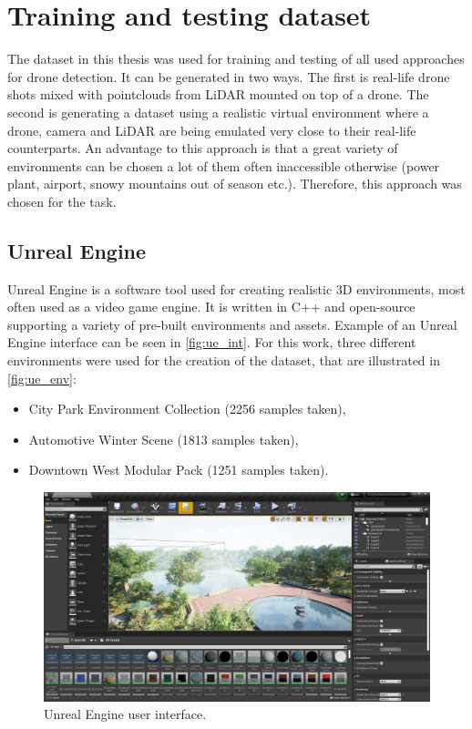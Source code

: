 \documentclass[twoside]{ctuthesis}
\theoremstyle{plain}
\theoremstyle{definition}
\theoremstyle{note}
\begin{document}
\section{Training and testing dataset} \label{s:2.6}
The dataset in this thesis was used for training and testing of all used approaches for drone detection. It can be generated in two ways. The first is real-life drone shots mixed with pointclouds from LiDAR mounted on top of a drone. The second is generating a dataset using a realistic virtual environment where a drone, camera and LiDAR are being emulated very close to their real-life counterparts. An advantage to this approach is that a great variety of environments can be chosen a lot of them often inaccessible otherwise (power plant, airport, snowy mountains out of season etc.). Therefore, this approach was chosen for the task.
\subsection{Unreal Engine}
Unreal Engine is a software tool used for creating realistic 3D environments, most often used as a video game engine. It is written in C++ and open-source supporting a variety of pre-built environments and assets. Example of an Unreal Engine interface can be seen in \autoref{fig:ue_int}. For this work, three different environments were used for the creation of the dataset, that are illustrated in \autoref{fig:ue_env}:
\begin{itemize}
	\item City Park Environment Collection (2256 samples taken),
	\item Automotive Winter Scene (1813 samples taken),
	\item Downtown West Modular Pack (1251 samples taken).
\end{itemize}
\begin{figure}
	\centering
	\includegraphics[width=\textwidth]{unreal_ui.png}
	\caption{Unreal Engine user interface.}
	\label{fig:ue_int}
\end{figure}
\end{document}
